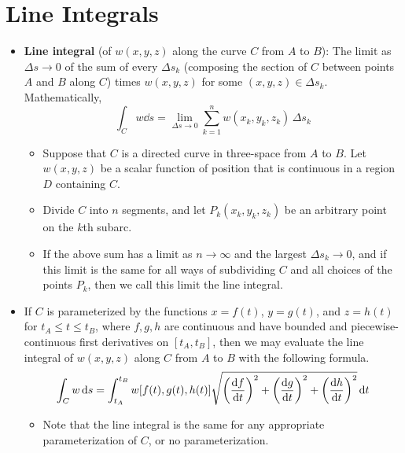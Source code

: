 \documentclass[../main.tex]{subfiles}
\begin{document}
\section{Line Integrals}
\begin{itemize}
    \item \textbf{Line integral} (of $w(x,y,z)$ along the curve $C$ from $A$ to $B$): The limit as $\Delta s\to 0$ of the sum of every $\Delta s_k$ (composing the section of $C$ between points $A$ and $B$ along $C$) times $w(x,y,z)$ for some $(x,y,z)\in\Delta s_k$. Mathematically,
    \begin{equation*}
        \int_Cw\dd{s} = \lim_{\Delta s\to 0}\sum_{k=1}^n w(x_k,y_k,z_k)\, \Delta s_k
    \end{equation*}
    \begin{itemize}
        \item Suppose that $C$ is a directed curve in three-space from $A$ to $B$. Let $w(x,y,z)$ be a scalar function of position that is continuous in a region $D$ containing $C$.
        \item Divide $C$ into $n$ segments, and let $P_k(x_k,y_k,z_k)$ be an arbitrary point on the $k$th subarc.
        \item If the above sum has a limit as $n\to\infty$ and the largest $\Delta s_k\to 0$, and if this limit is the same for all ways of subdividing $C$ and all choices of the points $P_k$, then we call this limit the line integral.
    \end{itemize}
    \item If $C$ is parameterized by the functions $x=f(t)$, $y=g(t)$, and $z=h(t)$ for $t_A\leq t\leq t_B$, where $f,g,h$ are continuous and have bounded and piecewise-continuous first derivatives on $[t_A,t_B]$, then we may evaluate the line integral of $w(x,y,z)$ along $C$ from $A$ to $B$ with the following formula.
    \begin{equation*}
        \int_Cw\dd{s} = \int_{t_A}^{t_B}w[f(t),g(t),h(t)]\sqrt{\left( \dv{f}{t} \right)^2+\left( \dv{g}{t} \right)^2+\left( \dv{h}{t} \right)^2}\dd{t}
    \end{equation*}
    \begin{itemize}
        \item Note that the line integral is the same for any appropriate parameterization of $C$, or no parameterization.
    \end{itemize}
\end{itemize}
\end{document}
